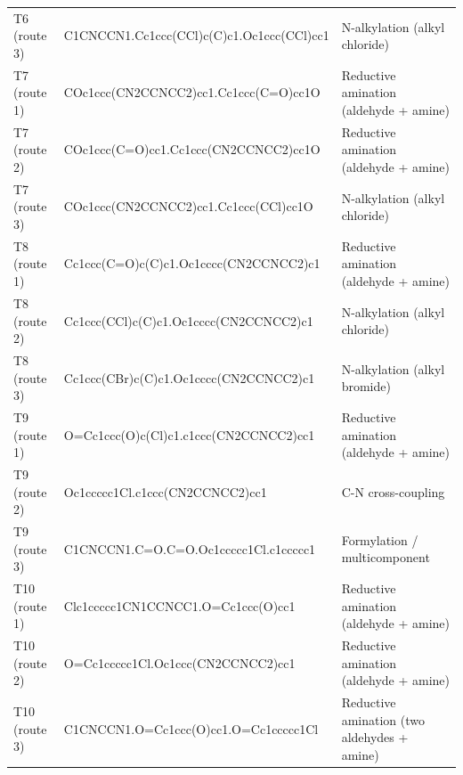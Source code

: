 \begin{table}[htbp]
\begin{tabular}{l l l}
T6 (route 3) & C1CNCCN1.Cc1ccc(CCl)c(C)c1.Oc1ccc(CCl)cc1 & N-alkylation (alkyl chloride) \\
T7 (route 1) & COc1ccc(CN2CCNCC2)cc1.Cc1ccc(C=O)cc1O & Reductive amination (aldehyde + amine) \\
T7 (route 2) & COc1ccc(C=O)cc1.Cc1ccc(CN2CCNCC2)cc1O & Reductive amination (aldehyde + amine) \\
T7 (route 3) & COc1ccc(CN2CCNCC2)cc1.Cc1ccc(CCl)cc1O & N-alkylation (alkyl chloride) \\
T8 (route 1) & Cc1ccc(C=O)c(C)c1.Oc1cccc(CN2CCNCC2)c1 & Reductive amination (aldehyde + amine) \\
T8 (route 2) & Cc1ccc(CCl)c(C)c1.Oc1cccc(CN2CCNCC2)c1 & N-alkylation (alkyl chloride) \\
T8 (route 3) & Cc1ccc(CBr)c(C)c1.Oc1cccc(CN2CCNCC2)c1 & N-alkylation (alkyl bromide) \\
T9 (route 1) & O=Cc1ccc(O)c(Cl)c1.c1ccc(CN2CCNCC2)cc1 & Reductive amination (aldehyde + amine) \\
T9 (route 2) & Oc1ccccc1Cl.c1ccc(CN2CCNCC2)cc1 & C-N cross-coupling \\
T9 (route 3) & C1CNCCN1.C=O.C=O.Oc1ccccc1Cl.c1ccccc1 & Formylation / multicomponent \\
T10 (route 1) & Clc1ccccc1CN1CCNCC1.O=Cc1ccc(O)cc1 & Reductive amination (aldehyde + amine) \\
T10 (route 2) & O=Cc1ccccc1Cl.Oc1ccc(CN2CCNCC2)cc1 & Reductive amination (aldehyde + amine) \\
T10 (route 3) & C1CNCCN1.O=Cc1ccc(O)cc1.O=Cc1ccccc1Cl & Reductive amination (two aldehydes + amine) \\
\bottomrule
\end{tabular}
\end{table}
